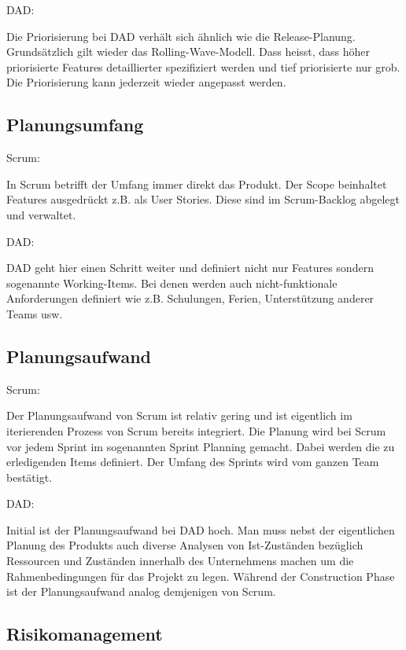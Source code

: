 {\Large DAD:} \cite{planningPrioDad} \medskip

Die Priorisierung bei DAD verhält sich ähnlich wie die Release-Planung. Grundsätzlich gilt wieder das Rolling-Wave-Modell. Dass heisst, dass höher priorisierte Features detaillierter spezifiziert werden und tief priorisierte nur grob. Die Priorisierung kann jederzeit wieder angepasst werden.


\subsection{Planungsumfang}

{\Large Scrum:} \medskip

In Scrum betrifft der Umfang immer direkt das Produkt. Der Scope beinhaltet Features ausgedrückt z.B. als User Stories. Diese sind im Scrum-Backlog abgelegt und verwaltet.
\bigskip 

{\Large DAD:} \cite{planningScopeDad} \medskip

DAD geht hier einen Schritt weiter und definiert nicht nur Features sondern sogenannte Working-Items. Bei denen werden auch nicht-funktionale Anforderungen definiert wie z.B. Schulungen, Ferien, Unterstützung anderer Teams usw.	


\subsection{Planungsaufwand}

{\Large Scrum:} \medskip

Der Planungsaufwand von Scrum ist relativ gering und ist eigentlich im iterierenden Prozess von Scrum bereits integriert. Die Planung wird bei Scrum vor jedem Sprint im sogenannten Sprint Planning gemacht. Dabei werden die zu erledigenden Items definiert. Der Umfang des Sprints wird vom ganzen Team bestätigt.\bigskip 

{\Large DAD:} \medskip

Initial ist der Planungsaufwand bei DAD hoch. Man muss nebst der eigentlichen Planung des Produkts auch diverse Analysen von Ist-Zuständen bezüglich Ressourcen und Zuständen innerhalb des Unternehmens machen um die Rahmenbedingungen für das Projekt zu legen. Während der Construction Phase ist der Planungsaufwand analog demjenigen von Scrum.


\subsection{Risikomanagement}

